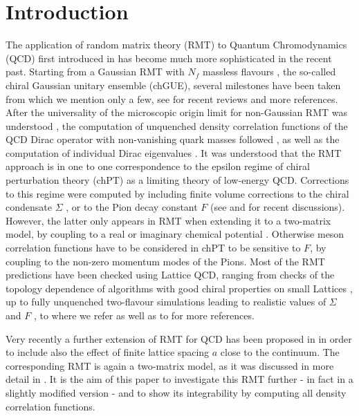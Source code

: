 \documentclass[11pt]{article}
\newcommand{\sect}[1]{\setcounter{equation}{0}\section{#1}}
\begin{document}
\renewcommand{\thefootnote}{\arabic{footnote}}
\setcounter{footnote}{0}



\sect{Introduction}\label{intro}

The application of random matrix theory (RMT) to Quantum
Chromodynamics (QCD) first introduced in \cite{SV93} has become much
more sophisticated in the recent past. Starting from a Gaussian RMT
with $N_f$ massless flavours \cite{SV93,JRMT}, the
so-called chiral Gaussian unitary ensemble (chGUE), several
milestones have been taken from which we mention only a few, 
see \cite{JacHB} for recent reviews and more references.
After the universality of the microscopic origin limit 
for non-Gaussian RMT was understood \cite{ADMN},
the computation of unquenched density correlation functions
of the QCD Dirac operator with non-vanishing quark masses followed
\cite{DN97,WGW}, as
well as the computation of individual Dirac eigenvalues
\cite{WGW,DNW,nagaoforr,AD03}. It was
understood \cite{DOTV} that the RMT approach is in one to one correspondence 
to the epsilon regime of chiral perturbation theory (chPT)  \cite{GL87a}
as a limiting theory of low-energy QCD. Corrections to this regime were
computed by including finite volume corrections to the chiral
condensate $\Sigma$ \cite{GL87a}, or to the Pion decay
constant $F$
\cite{ABL} (see \cite{DF} and\cite{LBHW} for recent discussions). 
However, the latter only appears in RMT when extending it to a
two-matrix model, by coupling to a real \cite{AOSV} 
or imaginary chemical potential \cite{DHSS,ADOS}.
Otherwise meson correlation functions have to be
considered in chPT to be sensitive to $F$,
by coupling to the non-zero momentum modes of the Pions. 
Most of the RMT predictions have been checked using Lattice QCD, ranging
from checks of the topology dependence of algorithms
with good chiral properties on small Lattices \cite{Edwards}, up to
fully unquenched two-flavour simulations leading to realistic values
of $\Sigma$ and $F$ \cite{Fukaya},  to where we refer as well as to
\cite{JacHB} for more references. 


Very recently a further extension of RMT for QCD has been proposed in
\cite{DSV} in order to include also the effect of finite lattice
spacing $a$ close to the continuum. The corresponding RMT is again a
two-matrix model, as it was discussed in more detail in \cite{ADSV}. 
It is the aim of this paper to investigate this RMT further - in fact
in a slightly modified version - and to show its integrability by
computing all density correlation functions. 
\end{document}
